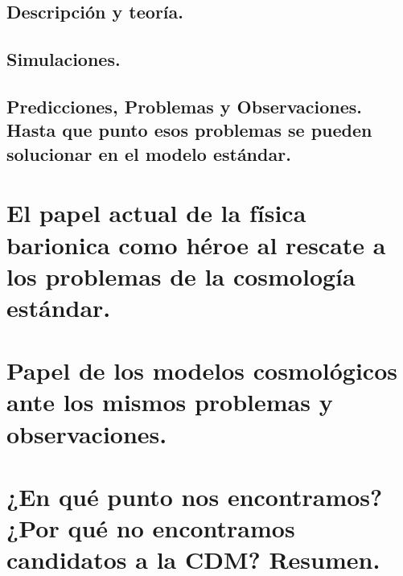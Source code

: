 \subsection{Descripción y teoría.}
\subsection{Simulaciones.}
\subsection{Predicciones, Problemas y Observaciones. Hasta que punto esos problemas se pueden solucionar en el modelo estándar.}

\section{ El papel actual de la física barionica como héroe al rescate a los problemas de la cosmología estándar.}

\section{Papel de los modelos cosmológicos ante los mismos problemas y observaciones.}

\section{¿En qué punto nos encontramos? ¿Por qué no encontramos candidatos a la CDM? Resumen.}

